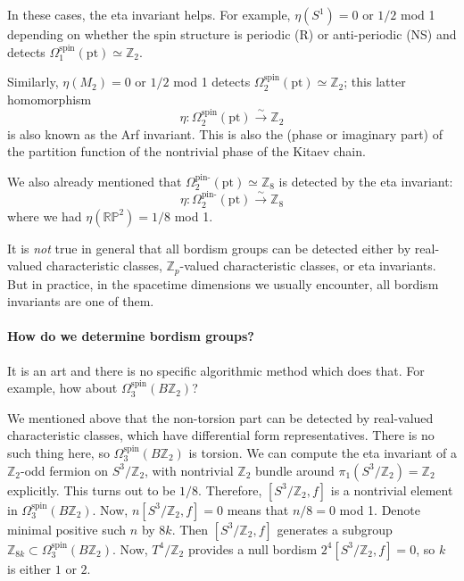 \documentclass[12pt]{article}
\numberwithin{equation}{section}
\numberwithin{figure}{section}
\theoremstyle{remark}
\def\bZ{\mathbb{Z}}
\def\RP{\mathbb{RP}}
\def\pt{\mathrm{pt}}
\begin{document}
In these cases, the eta invariant helps. 
For example, $\eta(S^1)=0$ or $1/2$ mod 1 depending on whether the spin structure is periodic (R) 
or anti-periodic (NS) and detects $\Omega^\text{spin}_1(\pt)\simeq \bZ_2$.

Similarly, $\eta(M_2)=0$ or $1/2$ mod 1 detects $\Omega_2^\text{spin}(\pt)\simeq \bZ_2$;
this latter homomorphism \begin{equation}
\eta : \Omega_2^\text{spin}(\pt) \xrightarrow{\sim} \bZ_2
\end{equation} is also known as the Arf invariant. 
This is also the (phase or imaginary part) of the
partition function of the nontrivial phase of the Kitaev chain.

We also already mentioned that $\Omega_2^\text{pin-}(\pt)\simeq \bZ_8$
is detected by the eta invariant: \begin{equation}
\eta : \Omega_2^\text{pin-}(\pt) \xrightarrow{\sim} \bZ_8
\end{equation} where we had $\eta(\RP^2)=1/8$ mod 1.

It is \emph{not} true in general that all bordism groups can be detected either by
real-valued characteristic classes,
$\bZ_p$-valued characteristic classes, or eta invariants.
But in practice, in the spacetime dimensions we usually encounter,
all bordism invariants are one of them.

\paragraph{How do we determine bordism groups?}

It is an art and there is no specific algorithmic method which does that.
For example, how about $\Omega^\text{spin}_3(B\bZ_2)$?

We mentioned above that the non-torsion part can be detected by real-valued characteristic classes,
which have differential form representatives. There is no such thing here, so 
$\Omega^\text{spin}_3(B\bZ_2)$ is torsion.
We can compute the eta invariant of a $\bZ_2$-odd fermion on $S^3/\bZ_2$,
with nontrivial $\bZ_2$ bundle around $\pi_1(S^3/\bZ_2)=\bZ_2$ explicitly.
This turns out to be $1/8$.
Therefore, $[S^3/\bZ_2,f]$ is a nontrivial element in $\Omega^\text{spin}_3(B\bZ_2)$.
Now,  $n[S^3/\bZ_2,f]=0$ means that $n/8=0$  mod 1.
Denote minimal positive such $n$ by $8k$.
Then $[S^3/\bZ_2,f]$ 
 generates a subgroup $\bZ_{8k} \subset \Omega^\text{spin}_3(B\bZ_2)$.
Now, $T^4/\bZ_2$ provides a null bordism $2^4[S^3/\bZ_2,f] = 0$,
so $k$ is either $1$ or $2$.
\end{document}
